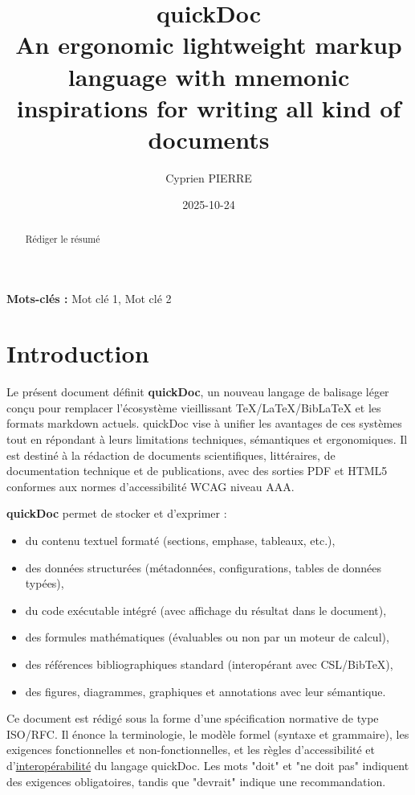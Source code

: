 \documentclass[a4paper,12pt]{article}
\author{Cyprien PIERRE \orcidlink{0009-0009-9040-6795}}
\date{2025-10-24}
\title{quickDoc\\\medskip
\large An ergonomic lightweight markup language with mnemonic inspirations for writing all kind of documents}
\newenvironment{keyword}{\begin{trivlist}\item[]{\bfseries Mots-clés :}}{\end{trivlist}}
\begin{document}
\maketitle
\begin{abstract}
Rédiger le résumé
\end{abstract}

\begin{keyword}
Mot clé 1, Mot clé 2
\end{keyword}
\section{Introduction}
\label{sec:org0e5882f}
Le présent document définit \textbf{quickDoc}, un nouveau langage de balisage léger conçu pour remplacer l’écosystème vieillissant \TeX{}/\LaTeX{}/BibLaTeX et les formats markdown actuels. quickDoc vise à unifier les avantages de ces systèmes tout en répondant à leurs limitations techniques, sémantiques et ergonomiques. Il est destiné à la rédaction de documents scientifiques, littéraires, de documentation technique et de publications, avec des sorties PDF et HTML5 conformes aux normes d’accessibilité WCAG niveau AAA.

\textbf{quickDoc} permet de stocker et d’exprimer :
\begin{itemize}
\item du contenu textuel formaté (sections, emphase, tableaux, etc.),
\item des données structurées (métadonnées, configurations, tables de données typées),
\item du code exécutable intégré (avec affichage du résultat dans le document),
\item des formules mathématiques (évaluables ou non par un moteur de calcul),
\item des références bibliographiques standard (interopérant avec CSL/BibTeX),
\item des figures, diagrammes, graphiques et annotations avec leur sémantique.
\end{itemize}

Ce document est rédigé sous la forme d’une spécification normative de type ISO/RFC. Il énonce la terminologie, le modèle formel (syntaxe et grammaire), les exigences fonctionnelles et non-fonctionnelles, et les règles d’accessibilité et d’\protect\hyperlink{gls-1}{\label{gls-1-use-1}interopérabilité} du langage quickDoc. Les mots "doit" et "ne doit pas" indiquent des exigences obligatoires, tandis que "devrait" indique une recommandation.
\end{document}
